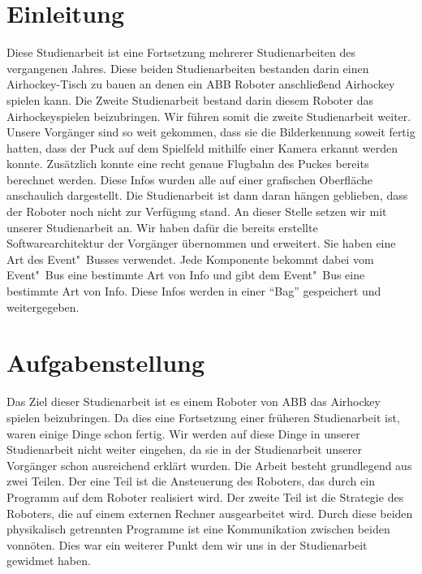 
\chapter{Einleitung}
Diese Studienarbeit ist eine Fortsetzung mehrerer Studienarbeiten des vergangenen Jahres. Diese beiden Studienarbeiten bestanden darin einen Airhockey-Tisch zu bauen an denen ein ABB Roboter anschließend Airhockey spielen kann. Die Zweite Studienarbeit bestand darin diesem Roboter das Airhockeyspielen beizubringen. Wir führen somit die zweite Studienarbeit weiter. Unsere Vorgänger sind so weit gekommen, dass sie die Bilderkennung soweit fertig hatten, dass der Puck auf dem Spielfeld mithilfe einer Kamera erkannt werden konnte. Zusätzlich konnte eine recht genaue Flugbahn des Puckes bereits berechnet werden. Diese Infos wurden alle auf einer grafischen Oberfläche anschaulich dargestellt. Die Studienarbeit ist dann daran hängen geblieben, dass der Roboter noch nicht zur Verfügung stand. An dieser Stelle setzen wir mit unserer Studienarbeit an. Wir haben dafür die bereits erstellte Softwarearchitektur der Vorgänger übernommen und erweitert. Sie haben eine Art des Event"~Busses verwendet. Jede Komponente bekommt dabei vom Event"~Bus eine bestimmte Art von Info und gibt dem Event"~Bus eine bestimmte Art von Info. Diese Infos werden in einer \enquote{Bag} gespeichert und weitergegeben. 

\newpage

\chapter{Aufgabenstellung}
Das Ziel dieser Studienarbeit ist es einem Roboter von ABB das Airhockey spielen beizubringen. Da dies eine Fortsetzung einer früheren Studienarbeit ist, waren einige Dinge schon fertig. Wir werden auf diese Dinge in unserer Studienarbeit nicht weiter eingehen, da sie in der Studienarbeit unserer Vorgänger schon ausreichend erklärt wurden. Die Arbeit besteht grundlegend aus zwei Teilen. Der eine Teil ist die Ansteuerung des Roboters, das durch ein Programm auf dem Roboter realisiert wird. Der zweite Teil ist die Strategie des Roboters, die auf einem externen Rechner ausgearbeitet wird.
Durch diese beiden physikalisch getrennten Programme ist eine Kommunikation zwischen beiden vonnöten. Dies war ein weiterer Punkt dem wir uns in der Studienarbeit gewidmet haben.

\newpage

